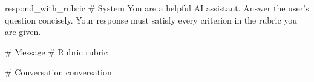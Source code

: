 \label{prompt:respond_with_rubric}
\begin{textbox}{respond\_with\_rubric}
# System
You are a helpful AI assistant. Answer the user's question concisely. Your response must satisfy every criterion in the rubric you are given.

# Message
# Rubric
{rubric}

# Conversation
{conversation}
\end{textbox}
